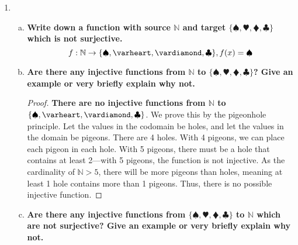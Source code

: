 \documentclass[article, 12pt]{article}
\theoremstyle{definition}
\DeclarePairedDelimiter\set{\{}{\}}
\newcommand{\nats}{\mathbb{N}}
\newcommand{\clubs}{\clubsuit}
\newcommand{\diamonds}{\vardiamond}
\newcommand{\hearts}{\varheart}
\newcommand{\spades}{\spadesuit}
\begin{document}
\begin{enumerate}[(1)]
\begin{proof}
            \[ f: \nats \to \nats, f(x) = \begin{cases} 1 & x = 1 \\ x-1 & x \neq 1 \end{cases} \]
            The union of the domains of the two pieces is the domain of the function, $\nats$. The intersection of the domains of the two pieces is the empty set, so the function is injective.
        \end{proof}
        \begin{proof}
            \textbf{The function is surjective}. The definition of surjective for a function $f$ with domain $A$ is
            \[ \forall y \exists x (x \in A \land f(x) = y) \]
            When $x \neq 1$, $f(x) = x - 1$. For all values $y$ in the codomain, there is a value $x$ in the domain, $y+1$, that maps to it. When $x=1$, $y=1$. Despite the image 1 having 2 preimages, 1, and 2, the definition of surjective is still satisfied.
        \end{proof}
        \item \begin{enumerate}[(a)]
            \item \textbf{Write down a function with source $\nats$ and target $\{\spades, \hearts, \diamonds, \clubs\}$ which is not surjective.}
            \[ f: \nats \to \set*{\spades, \hearts, \diamonds, \clubs}, f(x) = \spades \]
            \item \textbf{Are there any injective functions from $\nats$ to $\{\spades, \hearts, \diamonds, \clubs\}$? Give an example or very briefly explain why not.}
            \begin{proof}
                \textbf{There are no injective functions from $\nats$ to $\set*{\spades, \hearts, \diamonds, \clubs}$}. We prove this by the pigeonhole principle. Let the values in the codomain be holes, and let the values in the domain be pigeons. There are 4 holes. With 4 pigeons, we can place each pigeon in each hole. With 5 pigeons, there must be a hole that contains at least 2---with 5 pigeons, the function is not injective. As the cardinality of $\nats > 5$, there will be more pigeons than holes, meaning at least 1 hole contains more than 1 pigeons. Thus, there is no possible injective function.
            \end{proof}
            \item \textbf{Are there any injective functions from $\{\spades, \hearts, \diamonds, \clubs\}$ to $\nats$ which are not surjective? Give an example or very briefly explain why not.}

\end{enumerate}
\end{enumerate}
\end{document}
